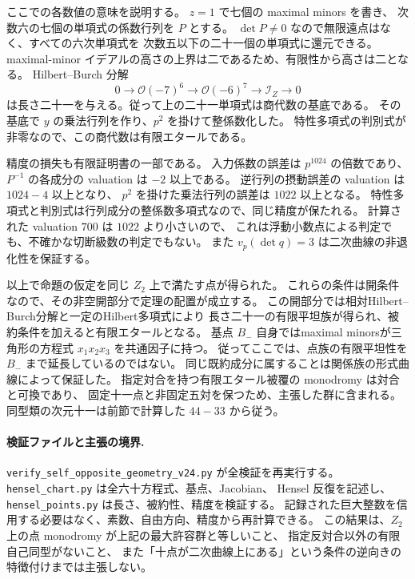 ここでの各数値の意味を説明する。
$z=1$ で七個の maximal minors を書き、
次数六の七個の単項式の係数行列を $P$ とする。
$\det P\ne0$ なので無限遠点はなく、すべての六次単項式を
次数五以下の二十一個の単項式に還元できる。
maximal-minor イデアルの高さの上界は二であるため、有限性から高さは二となる。
Hilbert--Burch 分解
\[
 0\longrightarrow\mathcal O(-7)^6\longrightarrow
 \mathcal O(-6)^7\longrightarrow\mathcal I_Z\longrightarrow0
\]
は長さ二十一を与える。従って上の二十一単項式は商代数の基底である。
その基底で $y$ の乗法行列を作り、$p^2$ を掛けて整係数化した。
特性多項式の判別式が非零なので、この商代数は有限エタールである。

精度の損失も有限証明書の一部である。
入力係数の誤差は $p^{1024}$ の倍数であり、
$P^{-1}$ の各成分の valuation は $-2$ 以上である。
逆行列の摂動誤差の valuation は $1024-4$ 以上となり、
$p^2$ を掛けた乗法行列の誤差は $1022$ 以上となる。
特性多項式と判別式は行列成分の整係数多項式なので、同じ精度が保たれる。
計算された valuation $700$ は $1022$ より小さいので、
これは浮動小数点による判定でも、不確かな切断級数の判定でもない。
また $v_p(\det q)=3$ は二次曲線の非退化性を保証する。

以上で命題の仮定を同じ $Z_2$ 上で満たす点が得られた。
これらの条件は開条件なので、その非空開部分で定理の配置が成立する。
この開部分では相対Hilbert--Burch分解と一定のHilbert多項式により
長さ二十一の有限平坦族が得られ、被約条件を加えると有限エタールとなる。
基点 $B_-$ 自身ではmaximal minorsが三角形の方程式 $x_1x_2x_3$ を共通因子に持つ。
従ってここでは、点族の有限平坦性を $B_-$ まで延長しているのではない。
同じ既約成分に属することは関係族の形式曲線によって保証した。
指定対合を持つ有限エタール被覆の monodromy は対合と可換であり、
固定十一点と非固定五対を保つため、主張した群に含まれる。
同型類の次元十一は前節で計算した $44-33$ から従う。

\paragraph{検証ファイルと主張の境界.}
\nolinkurl{verify_self_opposite_geometry_v24.py} が全検証を再実行する。
\nolinkurl{hensel_chart.py} は全六十方程式、基点、Jacobian、
Hensel 反復を記述し、\nolinkurl{hensel_points.py} は長さ、被約性、精度を検証する。
記録された巨大整数を信用する必要はなく、素数、自由方向、精度から再計算できる。
この結果は、$Z_2$ 上の点 monodromy が上記の最大許容群と等しいこと、
指定反対合以外の有限自己同型がないこと、
また「十点が二次曲線上にある」という条件の逆向きの特徴付けまでは主張しない。


